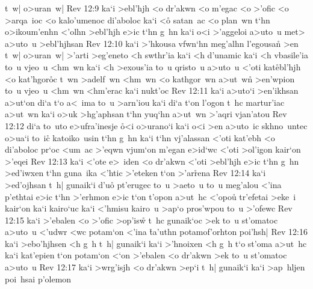 t~w|
o>uran~w|\bibvsend
\vs Rev 12:9
ka`i
>ebl'hjh
<o
dr'akwn
<o
m'egac
<o
>'ofic
<o
>arqa~ioc
<o
kalo'umenoc
di'aboloc
ka`i
<o\r{}
satan~ac
<o
plan~wn
t`hn
o>ikoum'enhn
<'olhn
>ebl'hjh
e>ic
t`hn
g~hn
ka`i
o<i
>'aggeloi
a>uto~u
met>
a>uto~u
>ebl'hjhsan\bibvsend
\vs Rev 12:10
ka`i
>'hkousa
vfwn`hn
meg'alhn
l'egousan\r{}
>en
t~w|
o>uran~w|
>'arti
>eg'eneto
<h
swthr'ia
ka`i
<h
d'unamic
ka`i
<h
vbasile'ia
to~u
vjeo~u
<hm~wn
ka`i
<h
>exous'ia
to~u
qristo~u
a>uto~u
<'oti
kat\r{e}bl'hjh
<o
kat'hgor\r{o}c
t~wn
>adelf~wn
<hm~wn
<o
kathgor~wn
a>ut~w\r{n}
>en'wpion
to~u
vjeo~u
<hm~wn
<hm'erac
ka`i
nukt'oc\bibvsend
\vs Rev 12:11
ka`i
a>uto`i
>en'ikhsan
a>ut`on
di`a
t`o
a<~ima
to~u
>arn'iou
ka`i
di`a
t`on
l'ogon
t~hc
martur'iac
a>ut~wn
ka`i
o>uk
>hg'aphsan
t`hn
yuq`hn
a>ut~wn
>'aqri
vjan'atou\bibvsend
\vs Rev 12:12
di`a
to~uto
e>ufra'inesje
\r{o}<i
o>urano`i
ka`i
o<i
>en
a>uto~ic
skhno~untec
o>ua`i
to~ic\r{}
katoiko~usin
t`hn
g~hn
ka`i
t`hn
vj'alassan
<'oti
kat'ebh
<o
di'aboloc
pr`oc
<um~ac
>'eqwn
vjum`on
m'egan
e>id`wc
<'oti
>ol'igon
kair`on
>'eqei\bibvsend
\vs Rev 12:13
ka`i
<'ote
e>~iden
<o
dr'akwn
<'oti
>ebl'hjh
e>ic
t`hn
g~hn
>ed'iwxen
t`hn
guna~ika
<'htic
>'eteken
t`on
>'ar\r{r}ena\bibvsend
{}
\vs Rev 12:14
ka`i
>ed'ojhsan
t~h|
gunaik`i
d'u\r{o}
pt'erugec
to~u
>aeto~u
to~u
meg'alou
<'ina
p'ethtai
e>ic
t`hn
>'erhmon
e>ic
t`on
t'opon
a>ut~hc
<'opou\r{}
tr'efetai
>eke~i
kair`on
ka`i
kairo`uc
ka`i
<'hmisu
kairo~u
>ap`o
pros'wpou
to~u
>'ofewc\bibvsend
\vs Rev 12:15
ka`i
>'ebalen
<o
>'ofic
>op'isw\r{}
t~hc
gunaik`oc
>ek
to~u
st'omatoc
a>uto~u
<'udwr
<wc
potam`on
<'ina
\r{t}a'uthn
potamof'orhton
poi'hsh|\bibvsend
\vs Rev 12:16
ka`i
>ebo'hjhsen
<h
g~h
t~h|
gunaik`i
ka`i
>'hnoixen
<h
g~h
t`o
st'oma
a>ut~hc
ka`i
kat'epien
t`on
potam`on
<`on
>'ebalen
<o
dr'akwn
>ek
to~u
st'omatoc
a>uto~u\bibvsend
\vs Rev 12:17
ka`i
>wrg'isjh
<o
dr'akwn
>ep`i
t~h|
gunaik`i
ka`i
>ap~hljen
poi~hsai
p'olemon
